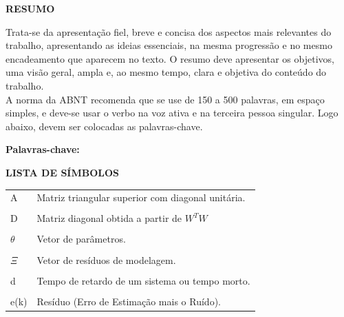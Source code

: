 \documentclass[a4paper,12pt]{article}
\begin{document}
\thispagestyle{empty}

\begin{center}
{\large \textbf{RESUMO}}
\end{center}

\vspace{3cm}

\begin{flushleft}

\hspace{4ex}Trata-se da apresentação fiel, breve e concisa dos aspectos mais relevantes do
trabalho, apresentando as ideias essenciais, na mesma progressão e no mesmo
encadeamento que aparecem no texto. O resumo deve apresentar os objetivos, uma
visão geral, ampla e, ao mesmo tempo, clara e objetiva do conteúdo do trabalho.\\
\hspace{4ex}A norma da ABNT recomenda que se use de 150 a 500 palavras, em espaço
simples, e deve-se usar o verbo na voz ativa e na terceira pessoa singular. Logo abaixo,
devem ser colocadas as palavras-chave.\\

\end{flushleft}

\vspace{1.5cm}

\textbf{Palavras-chave:}

\newpage


\thispagestyle{empty}

\begin{center}
{\large \textbf{LISTA DE SÍMBOLOS}}
\end{center}

\vspace{3cm}

\begin{tabular}{ l l }
A\hspace{1.5cm} & Matriz triangular superior com diagonal unitária.\\
\phantom{a} & \phantom{a}\\
D\hspace{1.5cm} & Matriz diagonal obtida a partir de $W^{T}W$\\
\phantom{a} & \phantom{a}\\
$\theta$\hspace{1.5cm} & Vetor de parâmetros.\\
\phantom{a} & \phantom{a}\\
$\Xi$\hspace{1.5cm} & Vetor de resíduos de modelagem.\\
\phantom{a} & \phantom{a}\\
d\hspace{1.5cm} & Tempo de retardo de um sistema ou tempo morto.\\
\phantom{a} & \phantom{a}\\
e(k)\hspace{1.5cm} & Resíduo (Erro de Estimação mais o Ruído).\\
\end{tabular}
\end{document}
